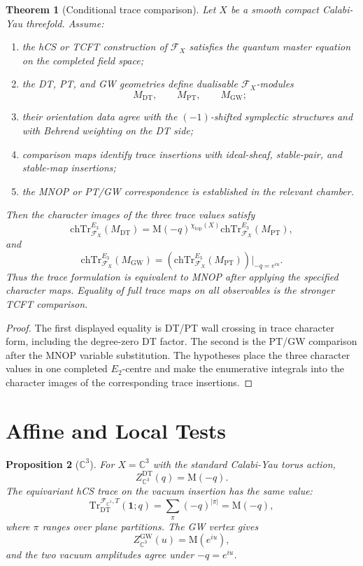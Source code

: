 \documentclass[11pt]{article}
\newtheorem{theorem}{Theorem}
\newtheorem{proposition}[theorem]{Proposition}
\theoremstyle{definition}
\providecommand{\C}{\mathbb{C}}
\providecommand{\cF}{\mathcal{F}}
\providecommand{\DT}{\mathrm{DT}}
\providecommand{\GW}{\mathrm{GW}}
\providecommand{\PT}{\mathrm{PT}}
\providecommand{\Tr}{\mathrm{Tr}}
\providecommand{\ch}{\mathrm{ch}}
\providecommand{\MM}{\mathrm{M}}
\providecommand{\topc}{\mathrm{top}}
\providecommand{\Etwo}{E_2}
\providecommand{\Ethree}{E_3}
\begin{document}
\begin{theorem}[Conditional trace comparison]
\label{thm:conditional-trace-comparison}
Let \(X\) be a smooth compact Calabi-Yau threefold.  Assume:
\begin{enumerate}
\item the hCS or TCFT construction of \(\cF_X\) satisfies the quantum
master equation on the completed field space;
\item the DT, PT, and GW geometries define dualisable \(\cF_X\)-modules
\[
  M_\DT,\qquad M_\PT,\qquad M_\GW;
\]
\item their orientation data agree with the \((-1)\)-shifted symplectic
structures and with Behrend weighting on the DT side;
\item comparison maps identify trace insertions with ideal-sheaf,
stable-pair, and stable-map insertions;
\item the MNOP or PT/GW correspondence is established in the relevant
chamber.
\end{enumerate}
Then the character images of the three trace values satisfy
\[
  \ch\Tr_{\cF_X}^{\Ethree}(M_\DT)
  =
  \MM(-q)^{\chi_{\topc}(X)}
  \ch\Tr_{\cF_X}^{\Ethree}(M_\PT),
\]
and
\[
  \ch\Tr_{\cF_X}^{\Ethree}(M_\GW)
  =
  \left(\ch\Tr_{\cF_X}^{\Ethree}(M_\PT)\right)\big|_{-q=e^{iu}}.
\]
Thus the trace formulation is equivalent to MNOP after applying the
specified character maps.  Equality of full trace maps on all
observables is the stronger TCFT comparison.
\end{theorem}

\begin{proof}
The first displayed equality is DT/PT wall crossing in trace character
form, including the degree-zero DT factor.  The second is the PT/GW
comparison after the MNOP variable substitution.  The hypotheses place
the three character values in one completed \(\Etwo\)-centre and make
the enumerative integrals into the character images of the corresponding
trace insertions.
\end{proof}

\section{Affine and Local Tests}

\begin{proposition}[\(\C^3\)]
\label{prop:c3}
For \(X=\C^3\) with the standard Calabi-Yau torus action,
\[
  Z_{\C^3}^{\DT}(q)=\MM(-q).
\]
The equivariant hCS trace on the vacuum insertion has the same value:
\[
  \Tr^{\cF_{\C^3},T}_{\DT}(\mathbf1;q)
  =
  \sum_{\pi}(-q)^{|\pi|}
  =
  \MM(-q),
\]
where \(\pi\) ranges over plane partitions.  The GW vertex gives
\[
  Z_{\C^3}^{\GW}(u)=\MM(e^{iu}),
\]
and the two vacuum amplitudes agree under \(-q=e^{iu}\).
\end{proposition}
\end{document}
